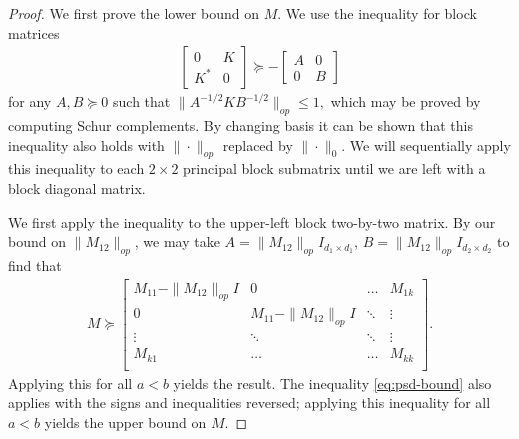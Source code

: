 \documentclass[aos]{imsart}
\theoremstyle{definition}
\numberwithin{equation}{section}
\renewcommand{\H}{{\mathbb{H}}}
\newcommand{\rv}{X}
\begin{document}
\begin{proof}
We first prove the lower bound on $M$. We use the inequality for block matrices
\begin{align}\begin{bmatrix} 0 & K \\ K^{*} & 0 \end{bmatrix} \succeq - \begin{bmatrix} A & 0 \\ 0 & B \end{bmatrix}\label{eq:psd-bound}\end{align} for any $A,B \succeq 0$ such that $\|A^{-1/2} K B^{-1/2}\|_{op} \leq 1,$ which may be proved by computing Schur complements. By changing basis it can be shown that this inequality also holds with $\| \cdot \|_{op}$ replaced by $\|\cdot\|_0$. We will sequentially apply this inequality to each $2\times 2$ principal block submatrix until we are left with a block diagonal matrix. 

We first apply the inequality to the upper-left block two-by-two matrix. By our bound on $\|M_{12}\|_{op}$, we may take
   $A = \|M_{12}\|_{op} I_{d_1\times d_1}$, $B = \|M_{12}\|_{op} I_{d_2\times d_2}$ to find that
   \begin{align*}
M \succeq \begin{bmatrix}
M_{11}-  \|M_{12}\|_{op} I & 0 & \hdots &  M_{1k} \\
0 & M_{11} - \|M_{12}\|_{op} I & \ddots & \vdots \\
\vdots & \ddots & \ddots & \vdots\\
M_{k1} & \hdots &  \hdots & M_{kk}\\
  \end{bmatrix}.\end{align*}
 Applying this for all $a < b$ yields the result. The inequality \cref{eq:psd-bound} also applies with the signs and inequalities reversed; applying this inequality for all $a < b$ yields the upper bound on $M$. \end{proof}
\end{document}
